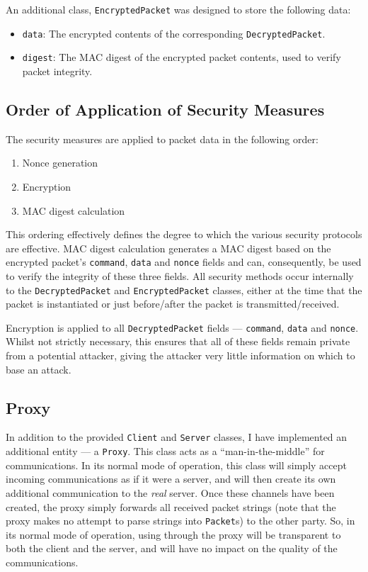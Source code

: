 \documentclass[a4paper,11pt]{article}
\begin{document}
An additional class, \verb+EncryptedPacket+ was designed to store the following
data:
\begin{itemize}
\item \verb+data+: The encrypted contents of the corresponding 
\verb+DecryptedPacket+.
\item \verb+digest+: The MAC digest of the encrypted packet contents, used to 
verify packet integrity.
\end{itemize}

\subsection{Order of Application of Security Measures}
The security measures are applied to packet data in the following order:
\begin{enumerate}
\item Nonce generation
\item Encryption
\item MAC digest calculation
\end{enumerate}

This ordering effectively defines the degree to which the various security 
protocols are effective. MAC digest calculation generates a MAC digest based on
the encrypted packet's \verb+command+, \verb+data+ and \verb+nonce+ fields and 
can, consequently, be used to verify the integrity of these three fields. All 
security methods occur internally to the \verb+DecryptedPacket+ and 
\verb+EncryptedPacket+ classes, either at the time that the packet is 
instantiated or just before/after the packet is transmitted/received.

Encryption is applied to all \verb+DecryptedPacket+ fields --- \verb+command+, 
\verb+data+ and \verb+nonce+. Whilst not strictly necessary, this ensures that 
all of these fields remain private from a potential attacker, giving the 
attacker very little information on which to base an attack. 

\subsection{Proxy}
In addition to the provided \serviceName{} \verb+Client+ and \verb+Server+ 
classes, I have implemented an additional \serviceName{} entity --- a 
\serviceName{} \verb+Proxy+. This class acts as a ``man-in-the-middle'' for
\serviceName{} communications. In its normal mode of operation, this class will
simply accept incoming \serviceName{} communications as if it were a 
\serviceName{} server, and will then create its own additional \serviceName{}
communication to the \emph{real} \serviceName{} server. Once these channels have
been created, the proxy simply forwards all received packet strings (note that 
the proxy makes no attempt to parse strings into \verb+Packet+s) to the other
party. So, in its normal mode of operation, using \serviceName{} through the
proxy will be transparent to both the client and the server, and will have no
impact on the quality of the communications.
\end{document}
